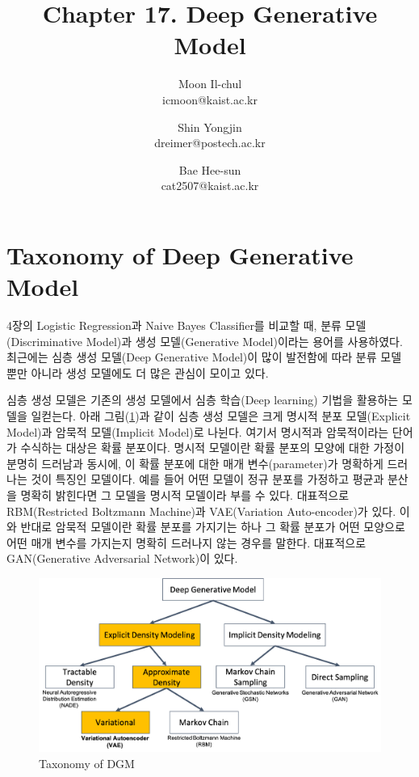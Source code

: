 \documentclass[draft=false]{oblivoir}
\author{Moon Il-chul \\ {icmoon@kaist.ac.kr}
   \and Shin Yongjin \\ {dreimer@postech.ac.kr} 
	\and Bae Hee-sun \\ {cat2507@kaist.ac.kr} }
\title{Chapter 17. Deep Generative Model}
\begin{document}
\maketitle
\tableofcontents

\section{Taxonomy of Deep Generative Model}
4장의 Logistic Regression과 Naive Bayes Classifier를 비교할 때, 분류 모델(Discriminative Model)과 생성 모델(Generative Model)이라는 용어를 사용하였다. 최근에는 심층 생성 모델(Deep Generative Model)이 많이 발전함에 따라 분류 모델 뿐만 아니라 생성 모델에도 더 많은 관심이 모이고 있다.

심층 생성 모델은 기존의 생성 모델에서 심층 학습(Deep learning) 기법을 활용하는 모델을 일컫는다. 아래 그림(\ref{fig:17-1})과 같이 심층 생성 모델은 크게 명시적 분포 모델(Explicit Model)과 암묵적 모델(Implicit Model)로 나뉜다. 여기서 명시적과 암묵적이라는 단어가 수식하는 대상은 확률 분포이다. 명시적 모델이란 확률 분포의 모양에 대한 가정이 분명히 드러남과 동시에, 이 확률 분포에 대한 매개 변수(parameter)가 명확하게 드러나는 것이 특징인 모델이다. 예를 들어 어떤 모델이 정규 분포를 가정하고 평균과 분산을 명확히 밝힌다면 그 모델을 명시적 모델이라 부를 수 있다. 대표적으로 RBM(Restricted Boltzmann Machine)과 VAE(Variation Auto-encoder)가 있다. 이와 반대로 암묵적 모델이란 확률 분포를 가지기는 하나 그 확률 분포가 어떤 모양으로 어떤 매개 변수를 가지는지 명확히 드러나지 않는 경우를 말한다. 대표적으로 GAN(Generative Adversarial Network)이 있다.
\begin{figure}[ht] \centering
  \includegraphics[scale=0.5]{fig1.png}
  \caption{Taxonomy of DGM}
  \label{fig:17-1}
\end{figure}
\end{document}
